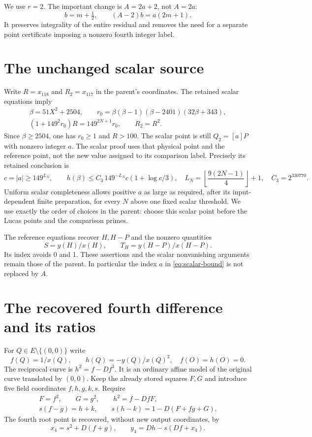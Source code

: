 \documentclass[11pt,a4paper]{article}
\begin{document}
We use $r=2$. The important change is $A=2a+2$, not $A=2a$:
\[
                 b=m+\tfrac12,\qquad (A-2)b=a(2m+1).
\]
It preserves integrality of the entire residual and removes the need for a
separate point certificate imposing a nonzero fourth integer label.

\section{The unchanged scalar source}
Write $R=x_{118}$ and $R_2=x_{117}$ in the parent's coordinates.
The retained scalar equations imply
\begin{equation}\label{eq:scalar}
 \begin{gathered}
 \beta=51X^2+2504,\qquad
 r_0=\beta(\beta-1)(\beta-2401)(32\beta+343),\\
 (1+149^2r_0)R=149^{2N+1}r_0,\qquad R_2=R^2.
 \end{gathered}
\end{equation}
Since $\beta\ge2504$, one has $r_0\ge1$ and $R>100$.
The scalar point is still $Q_2=[a]P$ with nonzero integer $a$.
The scalar proof uses that physical point and the reference point, not the
new value assigned to its comparison label. Precisely its retained conclusion is
\begin{equation}\label{eq:scalar-bound}
 c=|a|\ge149^{L_N},\qquad
 h(\beta)\le C_3\,149^{-L_N}c(1+\log c/3),
 \quad L_N=\left\lfloor\frac{9(2N-1)}4\right\rfloor+1,
 \quad C_3=2^{330770}.
\end{equation}
Uniform scalar completeness allows positive $a$ as large as required,
after its input-dependent finite preparation, for every $N$ above one
fixed scalar threshold. We use exactly the order of choices in the parent:
choose this scalar point before the Lucas points and the comparison primes.

The reference equations recover $H,H-P$ and the nonzero quantities
\[
 S=y(H)/x(H),\qquad T_H=y(H-P)/x(H-P).
\]
Its index avoids 0 and 1. These assertions and the scalar nonvanishing
arguments remain those of the parent. In particular the index $a$ in
\eqref{eq:scalar-bound} is not replaced by $A$.

\section{The recovered fourth difference and its ratios}
For $Q\in E\setminus\{(0,0)\}$ write
\[
 f(Q)=1/x(Q),\qquad h(Q)=-y(Q)/x(Q)^2,
 \quad f(O)=h(O)=0.
\]
The reciprocal curve is $h^2=f-Df^3$. It is an ordinary affine model
of the original curve translated by $(0,0)$.
Keep the already stored squares $F,G$ and introduce five field coordinates
$f,h,g,k,s$. Require
\begin{equation}\label{eq:pair}
 \begin{split}
 F=f^2,\qquad G=g^2,\qquad h^2=f-DfF,\\
 s(f-g)=h+k,\qquad s(h-k)=1-D(F+fg+G).
 \end{split}
\end{equation}
The fourth root point is recovered, without new output coordinates, by
\begin{equation}\label{eq:recover}
 x_4=s^2+D(f+g),\qquad y_4=Dh-s(Df+x_4).
\end{equation}
\end{document}
